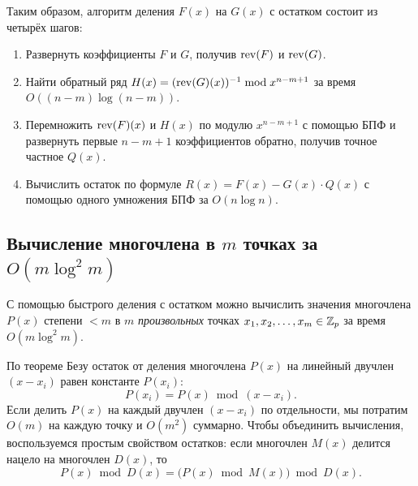 Таким образом, алгоритм деления $F(x)$ на $G(x)$ с остатком состоит из четырёх шагов:
\begin{enumerate}
    \item Развернуть коэффициенты $F$ и $G$, получив $\operatorname{rev}(F)$ и $\operatorname{rev}(G)$.
    \item Найти обратный ряд $H(x) = (\operatorname{rev}(G)(x))^{-1} \bmod x^{n - m + 1}$ за время $O((n - m) \log(n - m))$.
    \item Перемножить $\operatorname{rev}(F)(x)$ и $H(x)$ по модулю $x^{n - m + 1}$ с помощью БПФ и развернуть первые $n - m + 1$ коэффициентов обратно, получив точное частное $Q(x)$.
    \item Вычислить остаток по формуле $R(x) = F(x) - G(x) \cdot Q(x)$ с помощью одного умножения БПФ за $O(n \log n)$.
\end{enumerate}

\subsection{Вычисление многочлена в \texorpdfstring{$m$}{m} точках за \texorpdfstring{$O(m \log^2 m)$}{O(m log\^2 m)}}

С помощью быстрого деления с остатком можно вычислить значения многочлена $P(x)$ степени $< m$ в $m$ \emph{произвольных} точках $x_1, x_2, \dots, x_m \in \mathbb{Z}_p$ за время $O(m \log^2 m)$.

По теореме Безу остаток от деления многочлена $P(x)$ на линейный двучлен $(x - x_i)$ равен константе $P(x_i)$:
\[
    P(x_i) = P(x) \bmod (x - x_i).
\]
Если делить $P(x)$ на каждый двучлен $(x - x_i)$ по отдельности, мы потратим $O(m)$ на каждую точку и $O(m^2)$ суммарно. Чтобы объединить вычисления, воспользуемся простым свойством остатков: если многочлен $M(x)$ делится нацело на многочлен $D(x)$, то
\[
    P(x) \bmod D(x) = \bigl(P(x) \bmod M(x)\bigr) \bmod D(x).
\]

